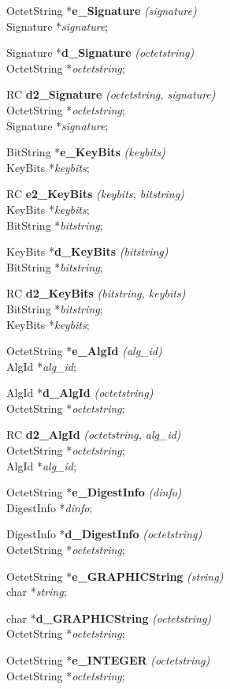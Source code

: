 OctetString *{\bf e\_Signature} {\em (signature)} \\
Signature *{\em signature}; 

Signature *{\bf d\_Signature} {\em (octetstring)} \\
OctetString *{\em octetstring}; 

RC {\bf d2\_Signature} {\em (octetstring, signature)} \\
OctetString *{\em octetstring}; \\
Signature *{\em signature}; 

BitString *{\bf e\_KeyBits} {\em (keybits)} \\
KeyBits *{\em keybits}; 

RC {\bf e2\_KeyBits} {\em (keybits, bitstring)} \\
KeyBits *{\em keybits}; \\
BitString *{\em bitstring}; 

KeyBits *{\bf d\_KeyBits} {\em (bitstring)} \\
BitString *{\em bitstring}; 

RC {\bf d2\_KeyBits} {\em (bitstring, keybits)} \\
BitString *{\em bitstring}; \\
KeyBits *{\em keybits}; 

OctetString *{\bf e\_AlgId} {\em (alg\_id)} \\
AlgId *{\em alg\_id}; 

AlgId *{\bf d\_AlgId} {\em (octetstring)} \\
OctetString *{\em octetstring}; 

RC {\bf d2\_AlgId} {\em (octetstring, alg\_id)} \\
OctetString *{\em octetstring}; \\
AlgId *{\em alg\_id}; 

OctetString *{\bf e\_DigestInfo} {\em (dinfo)} \\
DigestInfo *{\em dinfo}; 

DigestInfo *{\bf d\_DigestInfo} {\em (octetstring)} \\
OctetString *{\em octetstring};

OctetString *{\bf e\_GRAPHICString} {\em (string)} \\
char *{\em string}; 

char *{\bf d\_GRAPHICString} {\em (octetstring)} \\
OctetString *{\em octetstring};

OctetString *{\bf e\_INTEGER} {\em (octetstring)} \\
OctetString *{\em octetstring}; 

